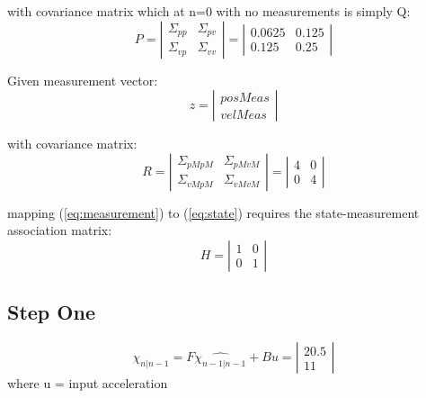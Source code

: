 \documentclass[12pt]{article}
\begin{document}
with covariance matrix which at n=0 with no measurements is simply Q:
\begin{equation}
P 
= 
\left |  \begin{array}{cc}
\Sigma_{pp} & \Sigma_{pv} \\
\Sigma_{vp} & \Sigma_{vv}
\end{array}  \right |
=
\left |  \begin{array}{cc}
0.0625 & 0.125 \\
0.125 & 0.25	
\end{array}  \right |
\end{equation}

Given measurement vector:
\begin{equation}\label{eq:measurement}
z 
=
\left |  \begin{array}{c}
posMeas \\
velMeas
\end{array}  \right |
\end{equation}

with covariance matrix:
\begin{equation}
R 
= 
\left |  \begin{array}{cc}
\Sigma_{pMpM} & \Sigma_{pMvM} \\
\Sigma_{vMpM} & \Sigma_{vMvM}
\end{array}  \right |
=
\left |  \begin{array}{cc}
4 & 0 \\
0 & 4
\end{array}  \right |
\end{equation}

mapping (\ref{eq:measurement}) to (\ref{eq:state}) requires the state-measurement association matrix:
\begin{equation}
H 
=
\left |  \begin{array}{cc}
1 & 0 \\
0 & 1
\end{array}  \right |
\end{equation}




\subsection{Step One}
\begin{equation}
\hat{\chi_{n|n-1}}
=
F\hat{\chi_{n-1|n-1}} + Bu
=
\left |  \begin{array}{c}
20.5 \\
11
\end{array}  \right |
\end{equation}
where u = input acceleration
\end{document}
